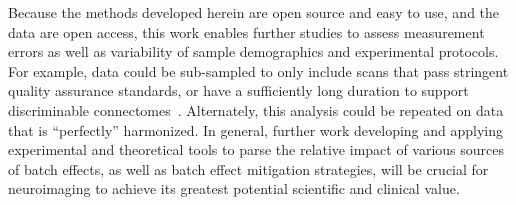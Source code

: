 \documentclass[11pt]{article}
\begin{document}
\begin{multicols}{2}
Because the methods developed herein are open source and easy to use, and the data are open access, this work enables further studies to assess measurement errors as well as variability of sample demographics and experimental protocols. For example, data could be sub-sampled to only include scans that pass stringent quality assurance standards, or have a sufficiently long duration to support discriminable connectomes~\cite{Airan17}.
 Alternately, this analysis could be repeated on data that is ``perfectly'' harmonized. In general, further work developing and applying experimental and theoretical tools to parse the relative impact of various sources of batch effects, as well as batch effect mitigation strategies, will be crucial for neuroimaging to achieve its greatest potential scientific and clinical value. 








\end{multicols}
\end{document}
